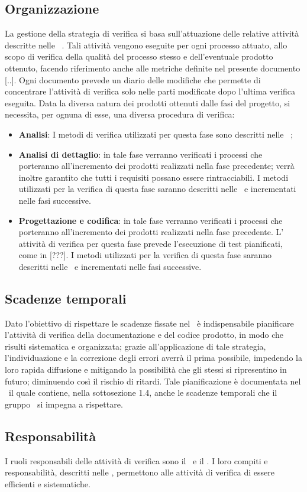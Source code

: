 \documentclass[../PianoDiQualifica.tex]{subfiles}
\begin{document}
		\subsection{Organizzazione}
		La gestione della strategia di verifica si basa sull'attuazione delle relative attività descritte nelle \normediprogetto\ . Tali attività vengono eseguite per ogni processo attuato, allo scopo di verifica della qualità del processo stesso e dell'eventuale prodotto ottenuto, facendo riferimento anche alle metriche definite nel presente documento [..].
		Ogni documento prevede un diario delle modifiche che permette di concentrare l'attività di verifica solo nelle parti modificate dopo l'ultima verifica eseguita.
		Data la diversa natura dei prodotti ottenuti dalle fasi del progetto, si necessita, per ognuna di esse, una diversa procedura di verifica:
		\begin{itemize}
		\item \textbf{Analisi}: I metodi di verifica utilizzati per questa fase sono descritti nelle \normediprogetto\ ;
		\item \textbf{Analisi di dettaglio}: in tale fase verranno verificati i processi che porteranno all'incremento dei prodotti realizzati nella fase precedente; verrà inoltre garantito che tutti i requisiti possano essere rintracciabili. I metodi utilizzati per la verifica di questa fase saranno descritti nelle \normediprogetto\ e incrementati nelle fasi successive.
		\item \textbf{Progettazione e codifica}: in tale fase verranno verificati i processi che porteranno all'incremento dei prodotti realizzati nella fase precedente. L' attività di verifica per questa fase prevede l'esecuzione di test pianificati, come in [???].  I metodi utilizzati per la verifica di questa fase saranno descritti nelle \normediprogetto\ e incrementati nelle fasi successive.
		\end{itemize} 
		
		\subsection{Scadenze temporali}
		Dato l'obiettivo di rispettare le scadenze fissate nel \pianodiprogetto\, è indispensabile pianificare l'attività di verifica della documentazione e del codice prodotto, in modo che risulti sistematica e organizzata; grazie all'applicazione di tale strategia, l'individuazione e la correzione degli errori averrà il prima possibile, impedendo la loro rapida diffusione e mitigando la possibilità che gli stessi si ripresentino in futuro; diminuendo così il rischio di ritardi. Tale pianificazione è documentata nel \pianodiprogetto\, il quale contiene, nella sottosezione 1.4, anche le scadenze temporali che il gruppo \kaleidoscode\ si impegna a rispettare.
		\subsection{Responsabilità}
		I ruoli responsabili delle attività di verifica sono il \responsabilediprogetto\ e il \verificatore. I loro compiti e responsabilità, descritti nelle \normediprogetto, permettono alle attività di verifica di essere efficienti e sistematiche.
\end{document}
